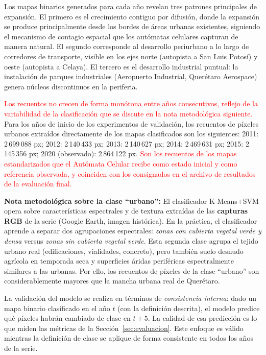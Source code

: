 Los mapas binarios generados para cada año revelan tres patrones principales de expansión. El primero es el crecimiento contiguo por difusión, donde la expansión se produce principalmente desde los bordes de áreas urbanas existentes, siguiendo el mecanismo de contagio espacial que los autómatas celulares capturan de manera natural. El segundo corresponde al desarrollo periurbano a lo largo de corredores de transporte, visible en los ejes norte (autopista a San Luis Potosí) y oeste (autopista a Celaya). El tercero es el desarrollo industrial puntual: la instalación de parques industriales (Aeropuerto Industrial, Querétaro Aerospace) genera núcleos discontinuos en la periferia.

\textcolor{red}{Los recuentos no crecen de forma monótona entre años consecutivos, reflejo de la variabilidad de la clasificación que se discute en la nota metodológica siguiente.} Para los años de inicio de los experimentos de validación, los recuentos de píxeles urbanos extraídos directamente de los mapas clasificados son los siguientes: 2011: 2\,699\,088 px; 2012: 2\,140\,433 px; 2013: 2\,140\,627 px; 2014: 2\,469\,631 px; 2015: 2\,145\,356 px; 2020 (observado): 2\,864\,122 px. \textcolor{red}{Son los recuentos de los mapas estandarizados que el Autómata Celular recibe como estado inicial y como referencia observada, y coinciden con los consignados en el archivo de resultados de la evaluación final.}

\textbf{Nota metodológica sobre la clase ``urbano'':} El clasificador K-Means+SVM opera sobre características espectrales y de textura extraídas de las \textbf{capturas RGB} de la serie (Google Earth, imagen histórica). En la práctica, el clasificador aprende a separar dos agrupaciones espectrales: \textit{zonas con cubierta vegetal verde y densa} versus \textit{zonas sin cubierta vegetal verde}. Esta segunda clase agrupa el tejido urbano real (edificaciones, vialidades, concreto), pero también suelo desnudo agrícola en temporada seca y superficies áridas periféricas espectralmente similares a las urbanas. Por ello, los recuentos de píxeles de la clase ``urbano'' son considerablemente mayores que la mancha urbana real de Querétaro.

La validación del modelo se realiza en términos de \textit{consistencia interna}: dado un mapa binario clasificado en el año $t$ (con la definición descrita), el modelo predice qué píxeles habrán cambiado de clase en $t+5$. La calidad de esa predicción es lo que miden las métricas de la Sección~\ref{sec:evaluacion}. Este enfoque es válido mientras la definición de clase se aplique de forma consistente en todos los años de la serie.

